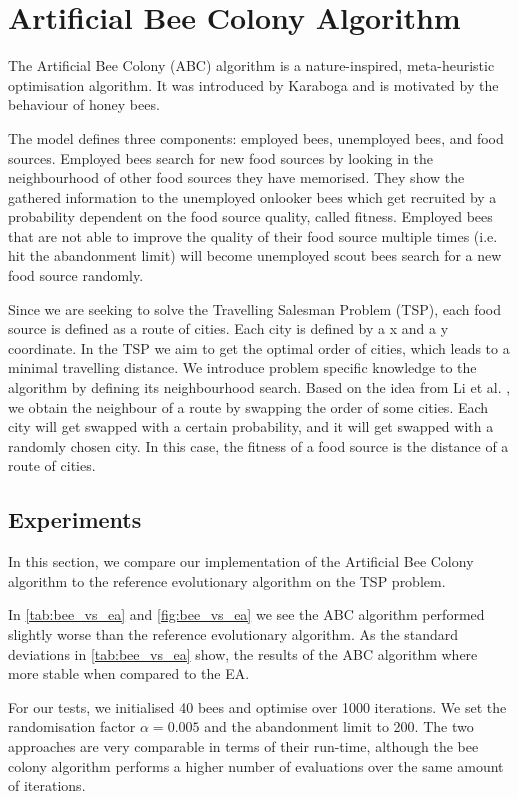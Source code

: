 \section{Artificial Bee Colony Algorithm}

The Artificial Bee Colony (ABC) algorithm is a nature-inspired, meta-heuristic
optimisation algorithm. It was introduced by Karaboga \cite{beecolony} and is
motivated by the behaviour of honey bees.

The model defines three components: employed bees, unemployed bees, and food
sources. Employed bees search for new food sources by looking in the
neighbourhood of other food sources they have memorised. They show the gathered
information to the unemployed onlooker bees which get recruited by a
probability dependent on the food source quality, called fitness. Employed bees
that are not able to improve the quality of their food source multiple times
(i.e. hit the abandonment limit) will become unemployed scout bees search for a
new food source randomly.

Since we are seeking to solve the Travelling Salesman Problem (TSP), each food
source is defined as a route of cities. Each city is defined by a x and a y
coordinate. In the TSP we aim to get the optimal order of cities, which leads
to a minimal travelling distance. We introduce problem specific knowledge to
the algorithm by defining its neighbourhood search. Based on the idea from Li
et al. \cite{beetsp}, we obtain the neighbour of a route by swapping the order
of some cities. Each city will get swapped with a certain probability, and it
will get swapped with a randomly chosen city. In this case, the fitness of a
food source is the distance of a route of cities.

\subsection{Experiments}

In this section, we compare our implementation of the Artificial Bee Colony
algorithm to the reference evolutionary algorithm on the TSP problem.

In \cref{tab:bee_vs_ea} and \cref{fig:bee_vs_ea} we see the ABC algorithm
performed slightly worse than the reference evolutionary algorithm. As the
standard deviations in \cref{tab:bee_vs_ea} show, the results of the ABC
algorithm where more stable when compared to the EA.

For our tests, we initialised 40 bees and optimise over 1000 iterations. We set
the randomisation factor $\alpha = 0.005$ and the abandonment limit to 200.
The two approaches are very comparable in terms of their run-time, although the
bee colony algorithm performs a higher number of evaluations over the same
amount of iterations.

